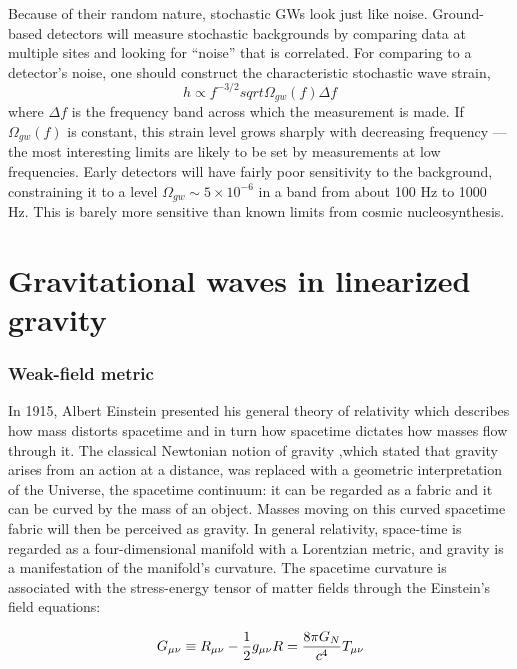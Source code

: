 \documentclass[binding=0.6cm, LaM]{sapthesis}
\begin{document}
Because of their random nature, stochastic GWs look just like noise.
Ground- based detectors will measure stochastic backgrounds by comparing data at multiple sites and looking for “noise” that is correlated.
For comparing to a detector’s noise, one should construct the characteristic stochastic wave strain,
\begin{equation}
h \propto f^{-3/2}sqrt{\Omega_{gw}(f)\Delta f}
\end{equation}
where $\Delta f$ is the frequency band across which the measurement is made.
If $\Omega_{gw}(f)$ is constant, this strain level grows sharply with decreasing frequency — the most interesting limits are likely to be set by measurements at low frequencies.
Early detectors will have fairly poor sensitivity to the background, constraining it to a level $\Omega_{gw} \sim 5 \times 10^{-6}$ in a band from about 100 Hz to 1000 Hz.
This is barely more sensitive than known limits from cosmic nucleosynthesis.





\chapter{Gravitational waves in linearized gravity}

\subsection{Weak-field metric}


In 1915, Albert Einstein presented his general theory of relativity  which describes how mass distorts spacetime and in turn how spacetime dictates how masses flow through it. 
The classical Newtonian notion of gravity ,which stated that gravity arises from an action at a distance, was replaced with a geometric interpretation of the Universe, the spacetime continuum: it 
can be regarded as a fabric and it can be curved by the mass of an object. Masses moving on this curved spacetime fabric will then be perceived as gravity. 
In general relativity, space-time is regarded as a four-dimensional manifold with a Lorentzian metric, and gravity is a manifestation of the manifold’s curvature.
 The spacetime curvature is associated with the stress-energy tensor of matter fields through the Einstein’s field equations:

\begin{equation}
G_{\mu\nu} \equiv R_{\mu\nu}  - {1 \over 2}g_{\mu\nu}R = {8\pi G_{N} \over {c^4}}T_{\mu\nu} 
\end{equation}
\end{document}
